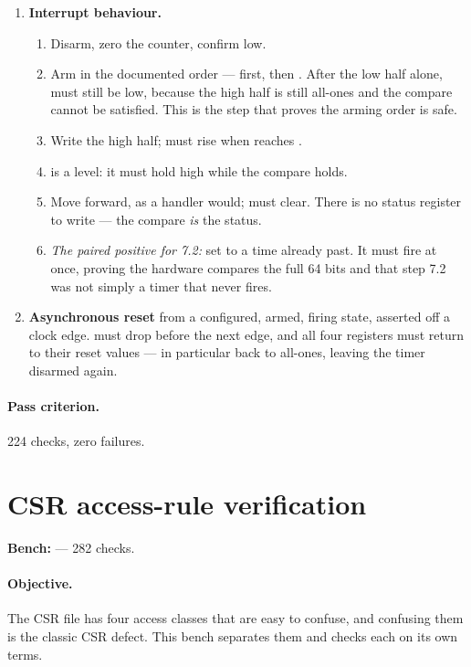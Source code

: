 \begin{enumerate}[leftmargin=*,itemsep=3pt]
\item[\textbf{7}] \textbf{Interrupt behaviour.}
\begin{enumerate}[label=7.\arabic*,leftmargin=12mm,itemsep=1pt]
  \item Disarm, zero the counter, confirm  low.
  \item Arm in the documented order ---  first, then
        . After the low half alone,  must still be
        low, because the high half is still all-ones and the compare cannot be
        satisfied. This is the step that proves the arming order is safe.
  \item Write the high half;  must rise when  reaches
        .
  \item {} is a level: it must hold high while the compare holds.
  \item Move  forward, as a handler would;  must clear.
        There is no status register to write --- the compare \emph{is} the
        status.
  \item \emph{The paired positive for 7.2:} set  to a time already
        past. It must fire at once, proving the hardware compares the full 64
        bits and that step 7.2 was not simply a timer that never fires.
\end{enumerate}

\item[\textbf{8}] \textbf{Asynchronous reset} from a configured, armed, firing
state, asserted off a clock edge.  must drop before the next edge, and
all four registers must return to their reset values --- in particular
 back to all-ones, leaving the timer disarmed again.
\end{enumerate}

\paragraph{Pass criterion.} 224 checks, zero failures.

\section{CSR access-rule verification}
\label{sec:vp-csr}

\textbf{Bench:}  --- 282 checks.

\paragraph{Objective.} The CSR file has four access classes that are easy to
confuse, and confusing them is the classic CSR defect. This bench separates them
and checks each on its own terms.

